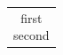 \documentclass{standalone}
\begin{document}
\begin{tabular}{c}\makecell{first\\second}\end{tabular}
\end{document}
